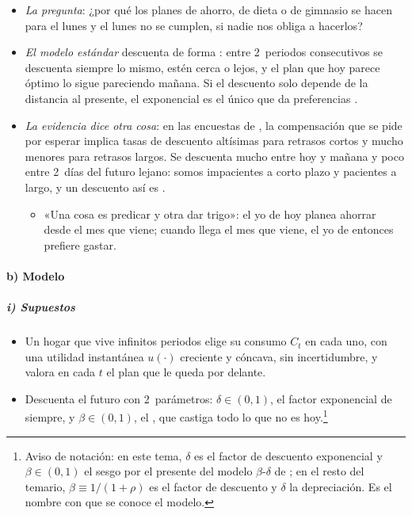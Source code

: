 \documentclass[11pt]{article}
\begin{document}
\begin{itemize}
\item \emph{La pregunta}: ¿por qué los planes de ahorro, de dieta o de gimnasio se hacen para el lunes y el lunes no se cumplen, si nadie nos obliga a hacerlos?
\item \emph{El modelo estándar} descuenta de forma \nocite{Samuelson1937}: entre 2~periodos consecutivos se descuenta siempre lo mismo, estén cerca o lejos, y el plan que hoy parece óptimo lo sigue pareciendo mañana. Si el descuento solo depende de la distancia al presente, el exponencial es el único que da preferencias \nocite{Strotz1955Myopia} .
\item \emph{La evidencia dice otra cosa}: en las encuestas de \textcite{Thaler1981Some}, la compensación que se pide por esperar implica tasas de descuento altísimas para retrasos cortos y mucho menores para retrasos largos. Se descuenta mucho entre hoy y mañana y poco entre 2~días del futuro lejano: somos impacientes a corto plazo y pacientes a largo, y un descuento así es .
  \begin{itemize}
  \item «Una cosa es predicar y otra dar trigo»: el yo de hoy planea ahorrar desde el mes que viene; cuando llega el mes que viene, el yo de entonces prefiere gastar.
  \end{itemize}
\end{itemize}

\paragraph{b) Modelo}

\subparagraph{i) Supuestos}

\begin{itemize}
\item Un hogar que vive infinitos periodos elige su consumo $C_t$ en cada uno, con una utilidad instantánea $u(\cdot)$ creciente y cóncava, sin incertidumbre, y valora en cada $t$ el plan que le queda por delante.
\item Descuenta el futuro con 2~parámetros: $\delta\in(0,1)$, el factor exponencial de siempre, y $\beta\in(0,1)$, el , que castiga todo lo que no es hoy\nocite{Laibson1997Golden}.\footnote{Aviso de notación: en este tema, $\delta$ es el factor de descuento exponencial y $\beta\in(0,1)$ el sesgo por el presente del modelo $\beta$-$\delta$ de ; en el resto del temario, $\beta\equiv1/(1+\rho)$ es el factor de descuento y $\delta$ la depreciación. Es el nombre con que se conoce el modelo.}
\end{itemize}
\end{document}
